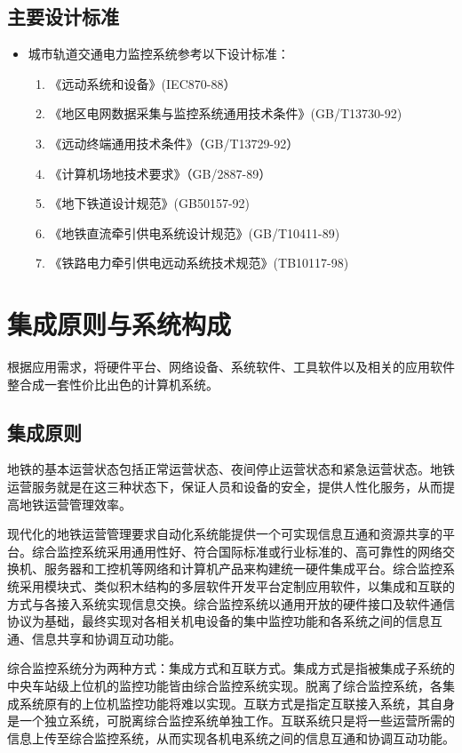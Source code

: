 \subsection{主要设计标准}
\begin{itemize}
	\item 城市轨道交通电力监控系统参考以下设计标准：
	\begin{enumerate}
		\item 《远动系统和设备》(IEC870-88）
		\item 《地区电网数据采集与监控系统通用技术条件》(GB/T13730-92)
		\item 《远动终端通用技术条件》（GB/T13729-92）
		\item 《计算机场地技术要求》（GB/2887-89）
		\item 《地下铁道设计规范》(GB50157-92)
		\item 《地铁直流牵引供电系统设计规范》(GB/T10411-89)
		\item 《铁路电力牵引供电远动系统技术规范》(TB10117-98)
	\end{enumerate}
\end{itemize}

\section{集成原则与系统构成}
根据应用需求，将硬件平台、网络设备、系统软件、工具软件以及相关的应用软件整合成一套性价比出色的计算机系统。
\subsection{集成原则}
地铁的基本运营状态包括正常运营状态、夜间停止运营状态和紧急运营状态。地铁运营服务就是在这三种状态下，保证人员和设备的安全，提供人性化服务，从而提高地铁运营管理效率。

现代化的地铁运营管理要求自动化系统能提供一个可实现信息互通和资源共享的平台。综合监控系统采用通用性好、符合国际标准或行业标准的、高可靠性的网络交换机、服务器和工控机等网络和计算机产品来构建统一硬件集成平台。综合监控系统采用模块式、类似积木结构的多层软件开发平台定制应用软件，以集成和互联的方式与各接入系统实现信息交换。综合监控系统以通用开放的硬件接口及软件通信协议为基础，最终实现对各相关机电设备的集中监控功能和各系统之间的信息互通、信息共享和协调互动功能。

综合监控系统分为两种方式：集成方式和互联方式。集成方式是指被集成子系统的中央车站级上位机的监控功能皆由综合监控系统实现。脱离了综合监控系统，各集成系统原有的上位机监控功能将难以实现。互联方式是指定互联接入系统，其自身是一个独立系统，可脱离综合监控系统单独工作。互联系统只是将一些运营所需的信息上传至综合监控系统，从而实现各机电系统之间的信息互通和协调互动功能。


